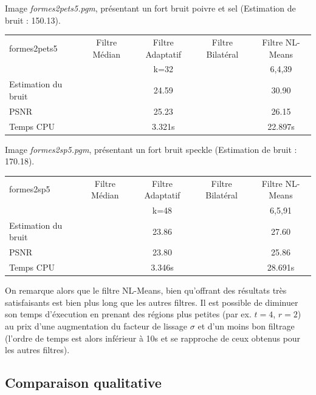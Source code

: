 \documentclass[a4,12pt]{article}
\begin{document}
\vspace{2em}

Image \textit{formes2pets5.pgm}, présentant un fort bruit poivre et sel (Estimation de bruit : 150.13).

\begin{center}
\begin{tabular}{|l||c|c|c|c|}
\hline
formes2pets5  & Filtre Médian & Filtre Adaptatif & Filtre Bilatéral & Filtre NL-Means\\
& & k=32 & & 6,4,39\\
\hline
Estimation du bruit
&
& 24.59
&
& 30.90\\
\hline
PSNR
&
& 25.23
&
& 26.15\\
\hline
Temps CPU
&
& 3.321s
&
& 22.897s\\
\hline
\end{tabular} 
\end{center}

\vspace{2em}

Image \textit{formes2sp5.pgm}, présentant un fort bruit speckle (Estimation de bruit : 170.18).

\begin{center}
\begin{tabular}{|l||c|c|c|c|}
\hline
formes2sp5  & Filtre Médian & Filtre Adaptatif & Filtre Bilatéral & Filtre NL-Means \\
& & k=48 & &6,5,91\\
\hline
Estimation du bruit
&
& 23.86
&
& 27.60\\
\hline
PSNR
&
& 23.80
&
& 25.86\\
\hline
Temps CPU
&
& 3.346s
&
& 28.691s\\
\hline
\end{tabular} 
\end{center}

On remarque alors que le filtre NL-Means, bien qu'offrant des résultats très satisfaisants est bien plus long que les autres filtres. Il est possible de diminuer son temps d'éxecution en prenant des régions plus petites (par ex. $t=4$, $r=2$) au prix d'une augmentation du facteur de lissage $\sigma$ et d'un moins bon filtrage (l'ordre de temps est alors inférieur à 10s et se rapproche de ceux obtenus pour les autres filtres).


\vspace{2em}

\subsection{Comparaison qualitative}
\end{document}
